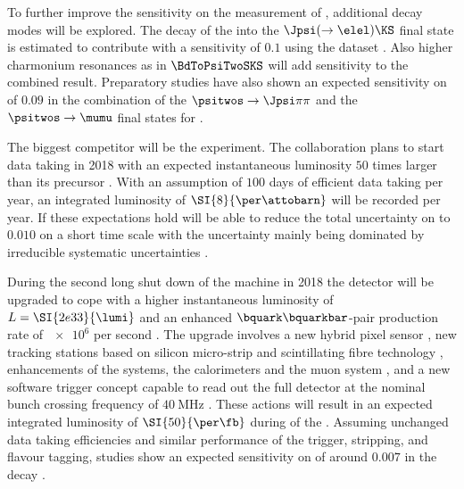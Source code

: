 To further improve the sensitivity on the measurement of \sintwobeta, additional
decay modes will be explored. The decay of the \Bd into the $\Jpsi (\to\elel)
\KS$ final state is estimated to contribute with a sensitivity of $\num{0.1}$
using the \RunOne dataset \cite{bdtojpsieeks:ramon}. Also higher charmonium
resonances as in $\BdToPsiTwoSKS$ will add sensitivity to the combined result.
Preparatory studies have also shown an expected sensitivity on \sintwobeta of
$\num{0.09}$ in the combination of the $\psitwos\to\Jpsi\pi\pi$ and the
$\psitwos\to\mumu$ final states for \RunOne \cite{Mueller:2014}.

The biggest competitor will be the \BelleTwo experiment. The collaboration plans
to start data taking in 2018 with an expected instantaneous luminosity
$\num{50}$ times larger than its precursor \Belle. With an assumption of
$\num{100}$ days of efficient data taking per year, an integrated luminosity of
$\SI{8}{\per\attobarn}$ will be recorded per year. If these expectations hold
\BelleTwo will be able to reduce the total uncertainty on \sintwobeta to
$\num{0.010}$ on a short time scale with the uncertainty mainly being dominated
by irreducible systematic uncertainties \cite{Aushev:2010bq}.

During the second long shut down of the \LHC machine in 2018 the \LHCb detector
will be upgraded to cope with a higher instantaneous luminosity of $L =
\SI{2e33}{\lumi}$ and an enhanced $\bquark\bquarkbar$-pair production rate of
$\num{e6}$ per second \cite{Bediaga:1443882}. The upgrade involves a new hybrid
pixel sensor \VELO \cite{TDRVELO}, new tracking stations based on silicon
micro-strip and scintillating fibre technology \cite{TDRTracking}, enhancements
of the \RICH systems, the calorimeters and the muon system \cite{TDRPID}, and a
new software trigger concept capable to read out the full detector at the
nominal bunch crossing frequency of $\SI{40}{\mega\hertz}$ \cite{TDRTrigger}.
These actions will result in an expected integrated luminosity of
$\SI{50}{\per\fb}$ during \RunThree of the \LHC. Assuming unchanged data taking
efficiencies and similar performance of the trigger, stripping, and flavour
tagging, \ToyMC studies show an expected sensitivity on \sintwobeta of around
$\num{0.007}$ \cite{Moedden:2015} in the decay \BdToJpsiKS.
